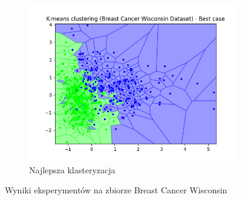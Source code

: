 \documentclass[12pt]{article}
\begin{document}
\begin{figure}[H]
\begin{subfigure}[t]{0.19\textwidth}
        \includegraphics[width=\linewidth]{img/other_datasets/cancer_kmeans_best.png}
        \caption{Najlepsza klasteryzacja}
    \end{subfigure}
    \caption{Wyniki eksperymentów na zbiorze Breast Cancer Wisconsin}
\end{figure}
\end{document}
